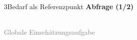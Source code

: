 \documentclass[xcolor=table,9pt,aspectratio=169]{beamer}
\begin{document}
\begin{frame}{\vspace*{10mm}3\hspace*{1em}Bedarf als Referenzpunkt}
\textbf{Abfrage (1/2)}\\
\medskip
\begin{center}
   \\
   \textcolor{gray}{Globale Einschätzungsaufgabe}
\end{center}
\end{frame}
\end{document}
